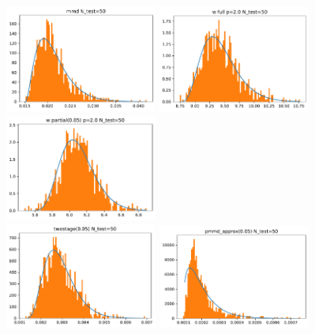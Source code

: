 \documentclass[a4paper,twoside,10pt]{article}
\theoremstyle{plain}
\theoremstyle{remark}
\begin{document}
\begin{figure}
\includegraphics[width=5cm]{experiment/v1/experiment.stl10rn18.run_0.corruption_strength_2-N_test_50-fraction_to_match_0.05-wasserstein_p_2.0.mmd_fit.pdf}
\includegraphics[width=5cm]{experiment/v1/experiment.stl10rn18.run_0.corruption_strength_2-N_test_50-fraction_to_match_0.05-wasserstein_p_2.0.wfull_fit.pdf}
\includegraphics[width=5cm]{experiment/v1/experiment.stl10rn18.run_0.corruption_strength_2-N_test_50-fraction_to_match_0.05-wasserstein_p_2.0.wpart_fit.pdf} \\
\includegraphics[width=5cm]{experiment/v1/experiment.stl10rn18.run_0.corruption_strength_2-N_test_50-fraction_to_match_0.05-wasserstein_p_2.0.twostage_fit.pdf}
\includegraphics[width=5cm]{experiment/v1/experiment.stl10rn18.run_0.corruption_strength_2-N_test_50-fraction_to_match_0.05-wasserstein_p_2.0.pmmd_approx_fit.pdf}

\end{figure}
\end{document}
